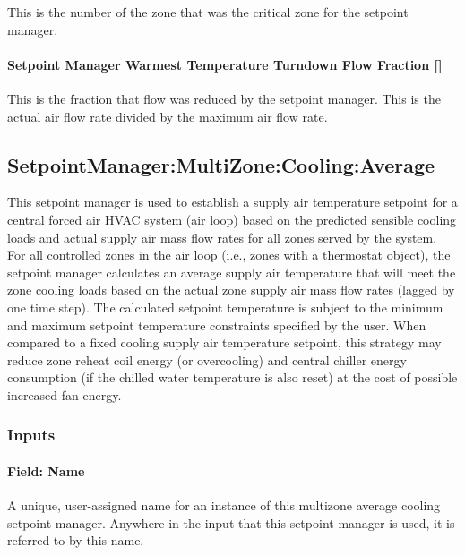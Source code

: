 This is the number of the zone that was the critical zone for the setpoint manager.

\paragraph{\texorpdfstring{Setpoint Manager Warmest Temperature Turndown Flow Fraction {[]}}{Setpoint Manager Warmest Temperature Turndown Flow Fraction }}\label{setpoint-manager-warmest-temperature-turndown-flow-fraction}

This is the fraction that flow was reduced by the setpoint manager. This is the actual air flow rate divided by the maximum air flow rate.

\subsection{SetpointManager:MultiZone:Cooling:Average}\label{setpointmanagermultizonecoolingaverage}

This setpoint manager is used to establish a supply air temperature setpoint for a central forced air HVAC system (air loop) based on the predicted sensible cooling loads and actual supply air mass flow rates for all zones served by the system. For all controlled zones in the air loop (i.e., zones with a thermostat object), the setpoint manager calculates an average supply air temperature that will meet the zone cooling loads based on the actual zone supply air mass flow rates (lagged by one time step). The calculated setpoint temperature is subject to the minimum and maximum setpoint temperature constraints specified by the user. When compared to a fixed cooling supply air temperature setpoint, this strategy may reduce zone reheat coil energy (or overcooling) and central chiller energy consumption (if the chilled water temperature is also reset) at the cost of possible increased fan energy.

\subsubsection{Inputs}\label{inputs-14-013}

\paragraph{Field: Name}\label{field-name-14-008}

A unique, user-assigned name for an instance of this multizone average cooling setpoint manager. Anywhere in the input that this setpoint manager is used, it is referred to by this name.

